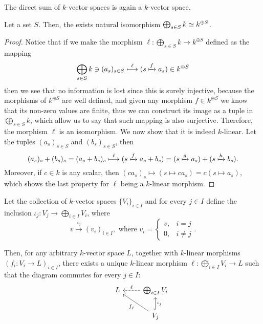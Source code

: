 \begin{proposition}
    The direct sum of \(k\)-vector spaces is again a \(k\)-vector space.
\end{proposition}

\begin{proposition}
    Let a set \(S\). Then, the exists natural isomorphism \(\bigoplus_{s \in S} k
    \simeq k^{\oplus S}\).
\end{proposition}

\begin{proof}
    Notice that if we make the morphism \(\ell : \bigoplus_{s \in S} k \to
    k^{\oplus S}\) defined as the mapping
    \[
        \bigoplus_{s \in S} k \ni (a_s)_{s \in S} \overset{\ell}\longmapsto (s
        \xmapsto{f} a_s) \in k^{\oplus S}
    \]
    then we see that no information is lost since this is surely injective,
    because the morphisms of \(k^{\oplus S}\) are well defined, and given any
    morphism \(f \in k^{\oplus S}\) we know that its non-zero values are finite,
    thus we can construct its image as a tuple in \(\bigoplus_{s \in S} k\),
    which allow us to say that such mapping is also surjective. Therefore, the
    morphism \(\ell\) is an isomorphism. We now show that it is indeed
    \(k\)-linear. Let the tuples \((a_s)_{s \in S}\) and \((b_s)_{s \in S}\),
    then
    \[
        (a_s)_s + (b_s)_s = (a_s + b_s)_s \overset \ell \longmapsto (s \xmapsto f
        a_s + b_s) = (s \xmapsto g a_s) + (s \xmapsto h b_s).
    \]
    Moreover, if \(c \in k\) is any scalar, then \((c a_s)_s \longmapsto (s
    \mapsto c a_s) = c (s \mapsto a_s)\), which shows the last property for
    \(\ell\) being a \(k\)-linear morphism.
\end{proof}

\begin{proposition}
    Let the collection of \(k\)-vector spaces \(\{V_i\}_{i \in I}\) and for every
    \(j \in I\) define the inclusion \(\iota_j : V_j \to \bigoplus_{i \in I}
    V_i\), where
    \[
        v \overset{\iota_j}\longmapsto (v_i)_{i \in I}, \text{ where } v_i =
        \begin{cases}
            v, & i = j    \\
            0, & i \neq j
        \end{cases}.
    \]

    Then, for any arbitrary \(k\)-vector space \(L\), together with \(k\)-linear
    morphisms \((f_i : V_i \to L)_{i \in I}\), there exists a unique \(k\)-linear
    morphism \(\ell : \bigoplus_{i \in I} V_i \to L\) such that the diagram
    commutes for every \(j \in I\):
    \[
        \begin{tikzcd}
            &L &\bigoplus_{i \in I} V_i \ar[l, dashed, swap, "\ell"]  \\
            & &V_j \ar[u, hook, swap, "\iota_j"] \ar[ul, "f_j"]
        \end{tikzcd}
    \]
\end{proposition}

